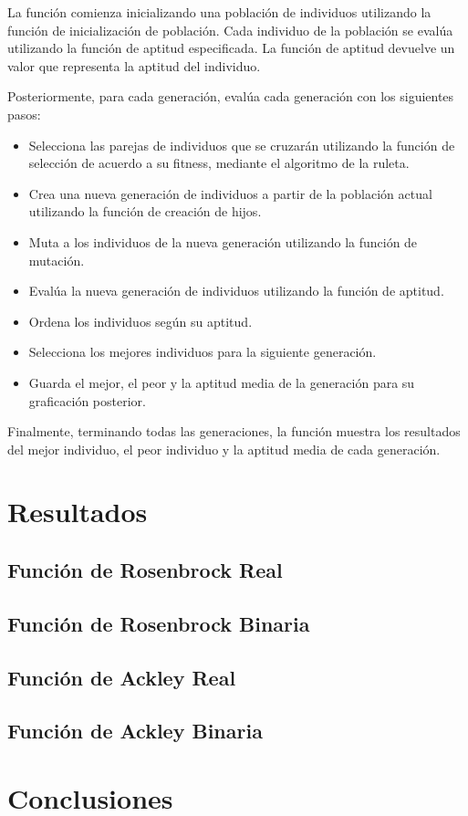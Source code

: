 \documentclass{report}
\begin{document}
    La función comienza inicializando una población de individuos utilizando la función de inicialización de población. Cada individuo de la
    población se evalúa utilizando la función de aptitud especificada. La función de aptitud devuelve un valor que representa la aptitud del individuo.

    Posteriormente, para cada generación, evalúa cada generación con los siguientes pasos:
    \begin{itemize}
        \item Selecciona las parejas de individuos que se cruzarán utilizando la función de selección de acuerdo a su fitness, mediante el algoritmo de la ruleta.
        \item Crea una nueva generación de individuos a partir de la población actual utilizando la función de creación de hijos.
        \item Muta a los individuos de la nueva generación utilizando la función de mutación.
        \item Evalúa la nueva generación de individuos utilizando la función de aptitud.
        \item Ordena los individuos según su aptitud.
        \item Selecciona los mejores individuos para la siguiente generación.
        \item Guarda el mejor, el peor y la aptitud media de la generación para su graficación posterior.
    \end{itemize}

    Finalmente, terminando todas las generaciones, la función muestra los resultados del mejor individuo, el peor individuo y la aptitud media de cada generación.

    \newpage

    \section*{Resultados}
    \subsection*{Función de Rosenbrock Real}

    \subsection*{Función de Rosenbrock Binaria} 
    \subsection*{Función de Ackley Real}

    \subsection*{Función de Ackley Binaria}
    \newpage

    \section*{Conclusiones}
    
\end{document}
